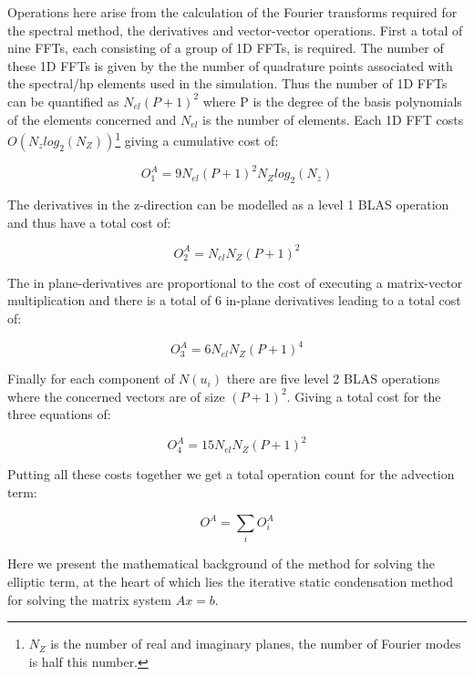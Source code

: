 Operations here arise from the calculation of the Fourier transforms required for the spectral method, the derivatives and vector-vector operations. First a total of nine FFTs, each consisting of a group of 1D FFTs, is required. The number of these 1D FFTs is given by the the number of quadrature points associated with the spectral/hp elements used in the simulation. Thus the number of 1D FFTs can be quantified as \(N_{el}(P+1)^2\) where P is the degree of the basis polynomials of the elements concerned and \(N_{el}\) is the number of elements. Each 1D FFT costs \(O(N_z log_2(N_Z))\)\footnote{\(N_Z\) is the number of real and imaginary planes, the number of Fourier modes is half this number.} giving a cumulative cost of:

\begin{equation}
O^A_1 = 9 N_{el}(P+1)^2N_Z log_2(N_z)
\end{equation}

The derivatives in the z-direction can be modelled as a level 1 BLAS operation and thus have a total cost of:

\begin{equation}
O^A_2 =N_{el}N_Z (P+1)^2
\end{equation}

The in plane-derivatives are proportional to the cost of executing a matrix-vector multiplication and there is a total of 6 in-plane derivatives leading to a total cost of:

\begin{equation}
O^A_3 = 6 N_{el}N_Z(P+1)^4
\end{equation}

Finally for each component of \(N(u_i)\) there are five level 2 BLAS operations where the concerned vectors are of size \((P+1)^2\). Giving a total cost for the three equations of:

\begin{equation}
O^A_4 = 15N_{el}N_Z(P+1)^2
\end{equation}

Putting all these costs together we get a total operation count for the advection term:

\begin{equation}
O^A = \sum_i O^A_i
\end{equation}

Here we present the mathematical background of the  method for solving the elliptic term, at the heart of which lies the iterative static condensation method for solving the matrix system \(Ax = b\). 

